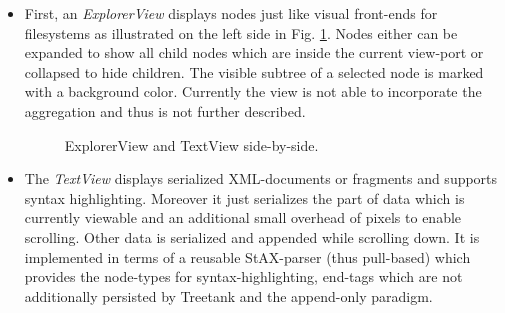 \begin{itemize}
\item
First, an \emph{ExplorerView} displays nodes just like visual front-ends for filesystems as illustrated on the left side in Fig. \ref{fig:treetextview}. Nodes either can be expanded to show all child nodes which are inside the current view-port or collapsed to hide children. The visible subtree of a selected node is marked with a background color. Currently the view is not able to incorporate the aggregation and thus is not further described.

\begin{figure}[tb]
\caption{\label{fig:treetextview} ExplorerView and TextView side-by-side.}
\end{figure}

\item
The \emph{TextView} displays serialized XML-documents or fragments and supports syntax highlighting. Moreover it just serializes the part of data which is currently viewable and an additional small overhead of pixels to enable scrolling. Other data is serialized and appended while scrolling down. It is implemented in terms of a reusable StAX-parser (thus pull-based) which provides the node-types for syntax-highlighting, end-tags which are not additionally persisted by Treetank and the append-only paradigm.%


\end{itemize}

